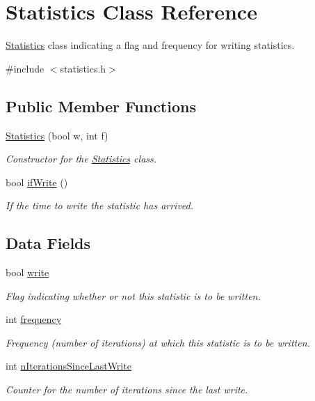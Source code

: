 \hypertarget{classStatistics}{\section{\-Statistics \-Class \-Reference}
\label{d9/d41/classStatistics}
}


\hyperlink{classStatistics}{\-Statistics} class indicating a flag and frequency for writing statistics.  




{\ttfamily \#include $<$statistics.\-h$>$}

\subsection*{\-Public \-Member \-Functions}
\begin{DoxyCompactItemize}
\item 
\hyperlink{classStatistics_af7716c05bd897fd8d7064d3ec4168d3e}{\-Statistics} (bool w, int f)
\begin{DoxyCompactList}\small\item\em \-Constructor for the \hyperlink{classStatistics}{\-Statistics} class. \end{DoxyCompactList}\item 
bool \hyperlink{classStatistics_ad608fa9f3e7f4cfc0906f017b029c0e1}{if\-Write} ()
\begin{DoxyCompactList}\small\item\em \-If the time to write the statistic has arrived. \end{DoxyCompactList}\end{DoxyCompactItemize}
\subsection*{\-Data \-Fields}
\begin{DoxyCompactItemize}
\item 
bool \hyperlink{classStatistics_a0d4a9d7982000ebb46ed99e8976758e4}{write}
\begin{DoxyCompactList}\small\item\em \-Flag indicating whether or not this statistic is to be written. \end{DoxyCompactList}\item 
int \hyperlink{classStatistics_ae70baa09998294893b3110c61f96f4d6}{frequency}
\begin{DoxyCompactList}\small\item\em \-Frequency (number of iterations) at which this statistic is to be written. \end{DoxyCompactList}\item 
int \hyperlink{classStatistics_acb9e45f4bbb77e2232735968e7f723b3}{n\-Iterations\-Since\-Last\-Write}
\begin{DoxyCompactList}\small\item\em \-Counter for the number of iterations since the last write. \end{DoxyCompactList}\end{DoxyCompactItemize}


